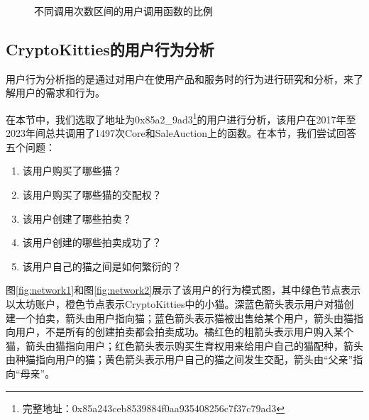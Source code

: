 \documentclass{myreport}
\begin{document}
\begin{figure}[!h]
	\caption{不同调用次数区间的用户调用函数的比例}
	\label{fig:user count function}
\end{figure}


\subsection{CryptoKitties的用户行为分析}
用户行为分析指的是通过对用户在使用产品和服务时的行为进行研究和分析，来了解用户的需求和行为。

在本节中，我们选取了地址为0x85a2\_9ad3\footnote{完整地址：0x85a243ceb8539884f0aa935408256c7f37c79ad3}的用户进行分析，该用户在2017年至2023年间总共调用了1497次Core和SaleAuction上的函数。在本节，我们尝试回答五个问题：
\begin{enumerate}
\item 该用户购买了哪些猫？
\item 该用户购买了哪些猫的交配权？
\item 该用户创建了哪些拍卖？
\item 该用户创建的哪些拍卖成功了？
\item 该用户自己的猫之间是如何繁衍的？
\end{enumerate}

图\ref{fig:network1}和图\ref{fig:network2}展示了该用户的行为模式图，其中绿色节点表示以太坊账户，橙色节点表示CryptoKitties中的小猫。深蓝色箭头表示用户对猫创建一个拍卖，箭头由用户指向猫；蓝色箭头表示猫被出售给某个用户，箭头由猫指向用户，不是所有的创建拍卖都会拍卖成功。橘红色的粗箭头表示用户购入某个猫，箭头由猫指向用户；红色箭头表示购买生育权用来给用户自己的猫配种，箭头由种猫指向用户的猫；黄色箭头表示用户自己的猫之间发生交配，箭头由“父亲”指向“母亲”。
\end{document}
